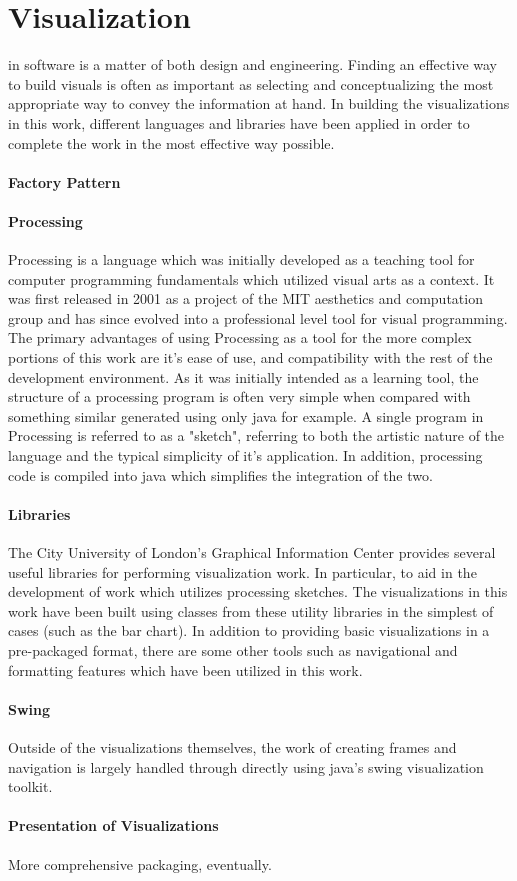 \section{Visualization}
\label{visualization}

 in software is a matter of both design and engineering. Finding an effective way to build visuals is often as important as selecting and conceptualizing the most appropriate way to convey the information at hand. In building the visualizations in this work, different languages and libraries have been applied in order to complete the work in the most effective way possible.

\paragraph{Factory Pattern}

\paragraph{Processing}
Processing is a language which was initially developed as a teaching tool for computer programming fundamentals which utilized visual arts as a context. It was first released in 2001 as a project of the MIT aesthetics and computation group and has since evolved into a professional level tool for visual programming. The primary advantages of using Processing as a tool for the more complex portions of this work are it's ease of use, and compatibility with the rest of the development environment. As it was initially intended as a learning tool, the structure of a processing program is often very simple when compared with something similar generated using only java for example. A single program in Processing is referred to as a "sketch", referring to both the artistic nature of the language and the typical simplicity of it's application. In addition, processing code is compiled into java which simplifies the integration of the two. 

\paragraph{Libraries}
The City University of London's Graphical Information Center provides several useful libraries for performing visualization work. In particular, to aid in the development of work which utilizes processing sketches. The visualizations in this work have been built using classes from these utility libraries in the simplest of cases (such as the bar chart). In addition to providing basic visualizations in a pre-packaged format, there are some other tools such as navigational and formatting features which have been utilized in this work.  

\paragraph{Swing}
Outside of the visualizations themselves, the work of creating frames and navigation is largely handled through directly using java's swing visualization toolkit.

\paragraph{Presentation of Visualizations}
More comprehensive packaging, eventually.

